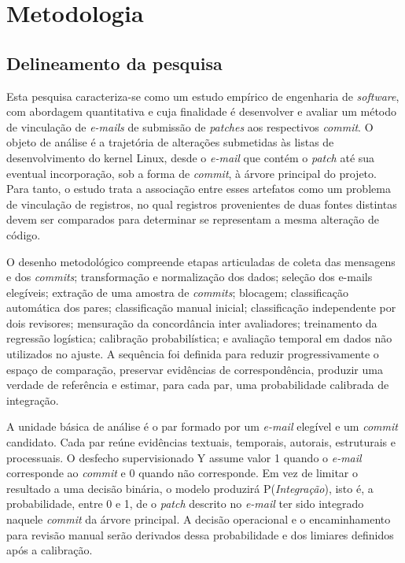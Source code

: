 
\chapter{Metodologia}
\label{chap:metodologia}

\section{Delineamento da pesquisa}

Esta pesquisa caracteriza-se como um estudo empírico de engenharia de \textit{software}, com abordagem quantitativa e cuja finalidade é desenvolver e avaliar um método de vinculação de \textit{e-mails} de submissão de \textit{patches} aos respectivos \textit{commit}. O objeto de análise é a trajetória de alterações submetidas às listas de desenvolvimento do kernel Linux, desde o \textit{e-mail} que contém o \textit{patch} até sua eventual incorporação, sob a forma de \textit{commit}, à árvore principal do projeto. Para tanto, o estudo trata a associação entre esses artefatos como um problema de vinculação de registros, no qual registros provenientes de duas fontes distintas devem ser comparados para determinar se representam a mesma alteração de código.

O desenho metodológico compreende etapas articuladas de coleta das mensagens e dos \textit{commits}; transformação e normalização dos dados; seleção dos e-mails elegíveis; extração de uma amostra de \textit{commits}; blocagem; classificação automática dos pares; classificação manual inicial; classificação independente por dois revisores; mensuração da concordância inter avaliadores; treinamento da regressão logística; calibração probabilística; e avaliação temporal em dados não utilizados no ajuste. A sequência foi definida para reduzir progressivamente o espaço de comparação, preservar evidências de correspondência, produzir uma verdade de referência e estimar, para cada par, uma probabilidade calibrada de integração.

A unidade básica de análise é o par formado por um \textit{e-mail} elegível e um \textit{commit} candidato. Cada par reúne evidências textuais, temporais, autorais, estruturais e processuais. O desfecho supervisionado Y assume valor 1 quando o \textit{e-mail} corresponde ao \textit{commit} e 0 quando não corresponde. Em vez de limitar o resultado a uma decisão binária, o modelo produzirá P(\textit{Integração}), isto é, a probabilidade, entre 0 e 1, de o \textit{patch} descrito no \textit{e-mail} ter sido integrado naquele \textit{commit} da árvore principal. A decisão operacional e o encaminhamento para revisão manual serão derivados dessa probabilidade e dos limiares definidos após a calibração.

